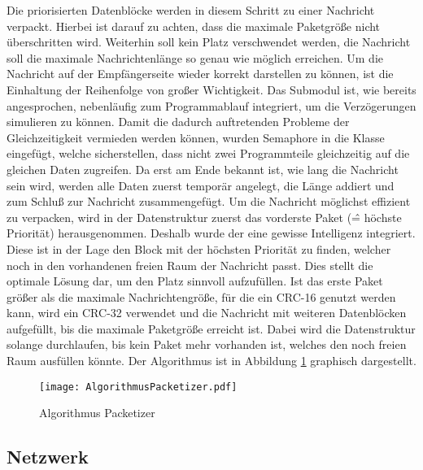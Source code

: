 Die priorisierten Datenbl{\"o}cke werden in diesem Schritt zu einer Nachricht
verpackt. Hierbei ist darauf zu achten, dass die maximale Paketgr{\"o}{\ss}e
nicht {\"u}berschritten wird. Weiterhin soll kein Platz verschwendet werden,
\dahe die Nachricht soll die maximale Nachrichtenl{\"a}nge so genau wie
m{\"o}glich erreichen.
Um die Nachricht auf der Empf{\"a}ngerseite wieder korrekt darstellen zu k{\"o}nnen, ist
die Einhaltung der Reihenfolge von gro{\ss}er Wichtigkeit. \newline
Das Submodul ist, wie bereits angesprochen, nebenl{\"a}ufig zum Programmablauf
integriert, um die Verz{\"o}gerungen simulieren zu k{\"o}nnen. Damit die
dadurch auftretenden Probleme der Gleichzeitigkeit vermieden werden k{\"o}nnen,
wurden Semaphore in die Klasse 
eingef{\"u}gt, welche sicherstellen, dass nicht zwei Programmteile gleichzeitig auf
die gleichen Daten zugreifen. Da erst am Ende bekannt ist, wie lang die
Nachricht sein wird, werden alle Daten zuerst tempor{\"a}r angelegt, die
L{\"a}nge addiert und zum Schlu{\ss} zur Nachricht zusammengef{\"u}gt.
Um die Nachricht m{\"o}glichst effizient zu verpacken, wird in der
Datenstruktur  zuerst das vorderste Paket
(\^= h{\"o}chste Priorit{\"a}t) herausgenommen. Deshalb wurde der
 eine gewisse Intelligenz integriert.
Diese ist in der Lage den Block mit der h{\"o}chsten Priorit{\"a}t zu finden, welcher
noch in den vorhandenen freien Raum der Nachricht passt. Dies stellt die
optimale L{\"o}sung dar, um den Platz sinnvoll aufzuf{\"u}llen. \newline 
Ist das erste Paket gr{\"o}{\ss}er als die maximale Nachrichtengr{\"o}{\ss}e,
f{\"u}r die ein CRC-16 genutzt werden kann, wird ein CRC-32 verwendet und die
Nachricht mit weiteren Datenbl{\"o}cken aufgef{\"u}llt, bis die maximale
Paketgr{\"o}ße erreicht ist. Dabei wird die Datenstruktur
 solange durchlaufen, bis kein Paket mehr vorhanden
ist, welches den noch freien Raum ausf{\"u}llen k{\"o}nnte. \newline 
Der Algorithmus ist in Abbildung \ref{fig:AlgorithmusPacketizer} graphisch
dargestellt.

\begin{figure}[H]
	\centering
	\texttt{[image: AlgorithmusPacketizer.pdf]}
	\caption{Algorithmus Packetizer}
	\label{fig:AlgorithmusPacketizer}
\end{figure}

\subsection{Netzwerk}


